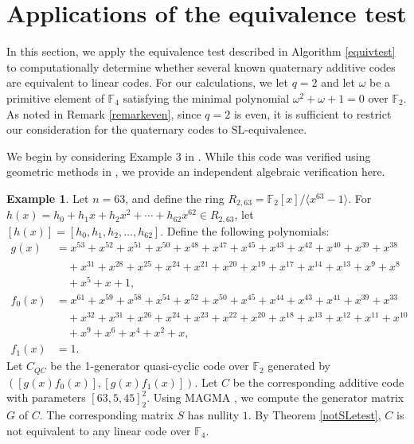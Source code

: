 \documentclass[a4paper,12pt]{article}
\theoremstyle{plain}
\theoremstyle{definition}
\newtheorem{example}{Example}
\begin{document}
 

 
\section{Applications of the equivalence test}

In this section, we apply the equivalence test described in Algorithm \ref{equivtest} to computationally determine whether several known quaternary additive codes are  equivalent to linear codes. For our calculations, we let $q = 2$ and let $\omega$ be a primitive element of $\mathbb{F}_4$ satisfying the minimal polynomial $\omega^2 + \omega + 1 = 0$ over $\mathbb{F}_2$. As noted in Remark \ref{remarkeven}, since $q=2$ is   even, it is sufficient to restrict our consideration for the quaternary codes to $\textrm{SL}$-equivalence. 

We begin by considering Example 3 in \cite{guan2023}. While this code was verified using geometric methods in \cite{ball2026}, we provide an independent algebraic verification here.

\begin{example} Let  $n = 63$, and define the ring $R_{2,63} = \mathbb{F}_2[x]/\langle x^{63} - 1 \rangle$.
For $h(x) = h_0 + h_1 x + h_2 x^2 + \cdots + h_{62} x^{62} \in R_{2,63}$, let  
$
[h(x)] = [h_0, h_1, h_2, \dots, h_{62}].
$ 
Define the following polynomials:
\begin{align*}
g(x) &= x^{53} + x^{52} + x^{51} + x^{50} + x^{48} + x^{47} + x^{45} + x^{43} + x^{42} + x^{40} + x^{39} + x^{38} \\
&\quad + x^{31} + x^{28} + x^{25} + x^{24} + x^{21} + x^{20} + x^{19} + x^{17} + x^{14} + x^{13} + x^9 + x^8 \\
&\quad + x^5 + x + 1, \\
f_0(x) &= x^{61} + x^{59} + x^{58} + x^{54} + x^{52} + x^{50} + x^{45} + x^{44} + x^{43} + x^{41} + x^{39} + x^{33} \\
&\quad + x^{32} + x^{31} + x^{26} + x^{24} + x^{23} + x^{22} + x^{20} + x^{18} + x^{13} + x^{12} + x^{11} + x^{10} \\
&\quad + x^9 + x^6 + x^4 + x^2 + x, \\
f_1(x) &= 1.
\end{align*}
Let $C_{QC}$ be the 1-generator quasi-cyclic code over $\mathbb{F}_2$ generated by $([g(x)f_0(x)], [g(x)f_1(x)])$. Let $C$ be the corresponding additive code with parameters $[63, 5,45]^2_2$. 
Using MAGMA \cite{magma}, we compute the generator matrix $G$ of $C$. 
The corresponding matrix $S$ has nullity $1$.
By Theorem \ref{notSLetest}, $C$ is not equivalent to any linear code over $\mathbb{F}_4$.
\end{example}
\end{document}
